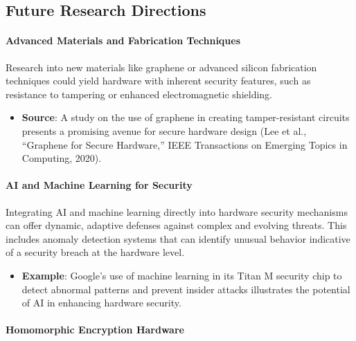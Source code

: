 \hypertarget{future-research-directions}{%
\subsection{Future Research
Directions}\label{future-research-directions}}

\hypertarget{advanced-materials-and-fabrication-techniques}{%
\paragraph{Advanced Materials and Fabrication
Techniques}\label{advanced-materials-and-fabrication-techniques}}

Research into new materials like graphene or advanced silicon
fabrication techniques could yield hardware with inherent security
features, such as resistance to tampering or enhanced electromagnetic
shielding.

\begin{itemize}
\item
  \textbf{Source}: A study on the use of graphene in creating
  tamper-resistant circuits presents a promising avenue for secure
  hardware design (Lee et al., ``Graphene for Secure Hardware,'' IEEE
  Transactions on Emerging Topics in Computing, 2020).
\end{itemize}

\hypertarget{ai-and-machine-learning-for-security}{%
\paragraph{AI and Machine Learning for
Security}\label{ai-and-machine-learning-for-security}}

Integrating AI and machine learning directly into hardware security
mechanisms can offer dynamic, adaptive defenses against complex and
evolving threats. This includes anomaly detection systems that can
identify unusual behavior indicative of a security breach at the
hardware level.

\begin{itemize}
\item
  \textbf{Example}: Google's use of machine learning in its Titan M
  security chip to detect abnormal patterns and prevent insider attacks
  illustrates the potential of AI in enhancing hardware security.
\end{itemize}

\hypertarget{homomorphic-encryption-hardware}{%
\paragraph{Homomorphic Encryption
Hardware}\label{homomorphic-encryption-hardware}}


